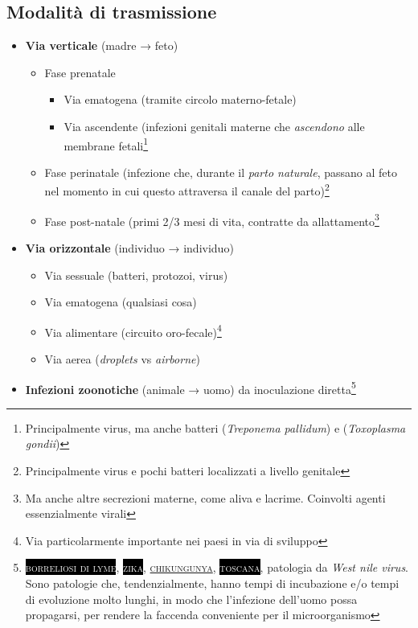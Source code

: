 \documentclass[italian,]{article}
\providecommand{\tightlist}{%
  \setlength{\itemsep}{0pt}\setlength{\parskip}{0pt}}
\newcommand{\pat}[1]{\colorbox{black}{\textcolor{white}{\textsc{#1}}}}
\renewcommand{\a}[1]{\underline{\textsc{#1}}}
\begin{document}
\hypertarget{modalituxe0-di-trasmissione}{%
\subsection*{Modalità di
trasmissione}\label{modalituxe0-di-trasmissione}}

\begin{itemize}
\tightlist
\item
  \textbf{Via verticale} (madre → feto)

  \begin{itemize}
  \tightlist
  \item
    Fase prenatale

    \begin{itemize}
    \tightlist
    \item
      Via ematogena (tramite circolo materno-fetale)
    \item
      Via ascendente (infezioni genitali materne che \emph{ascendono}
      alle membrane fetali\footnote{Principalmente virus, ma anche
        batteri (\emph{Treponema pallidum}) e (\emph{Toxoplasma gondii})}
    \end{itemize}
  \item
    Fase perinatale (infezione che, durante il \emph{parto naturale},
    passano al feto nel momento in cui questo attraversa il canale del
    parto)\footnote{Principalmente virus e pochi batteri localizzati a
      livello genitale}
  \item
    Fase post-natale (primi 2/3 mesi di vita, contratte da
    allattamento\footnote{Ma anche altre secrezioni materne, come aliva
      e lacrime. Coinvolti agenti essenzialmente virali}
  \end{itemize}
\item
  \textbf{Via orizzontale} (individuo → individuo)

  \begin{itemize}
  \tightlist
  \item
    Via sessuale (batteri, protozoi, virus)
  \item
    Via ematogena (qualsiasi cosa)
  \item
    Via alimentare (circuito oro-fecale)\footnote{Via particolarmente
      importante nei paesi in via di sviluppo}
  \item
    Via aerea (\emph{droplets} vs \emph{airborne})
  \end{itemize}
\item
  \textbf{Infezioni zoonotiche} (animale → uomo) da inoculazione
  diretta\footnote{\pat{borreliosi di lyme}, \pat{zika},
    \a{chikungunya}, \pat{toscana}, patologia da \emph{West nile virus}.
    Sono patologie che, tendenzialmente, hanno tempi di incubazione e/o
    tempi di evoluzione molto lunghi, in modo che l'infezione dell'uomo
    possa propagarsi, per rendere la faccenda conveniente per il
    microorganismo}
\end{itemize}
\end{document}
